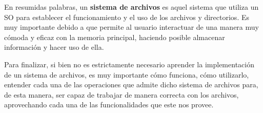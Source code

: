 \documentclass[12pt, a4paper]{article} %
\begin{document}
En resumidas palabras, un \textbf{sistema de archivos} es aquel sistema que utiliza un SO para establecer el funcionamiento y el uso de los archivos y directorios. Es muy importante debido a que permite al usuario interactuar de una manera muy cómoda y eficaz con la memoria principal, haciendo posible almacenar información y hacer uso de ella.

Para finalizar, si bien no es estrictamente necesario aprender la implementación de un sistema de archivos, es muy importante cómo funciona, cómo utilizarlo, entender cada una de las operaciones que admite dicho sistema de archivos para, de esta manera, ser capaz de trabajar de manera correcta con los archivos, aprovechando cada una de las funcionalidades que este nos provee.

\nocite{*} %

\clearpage


\end{document}
